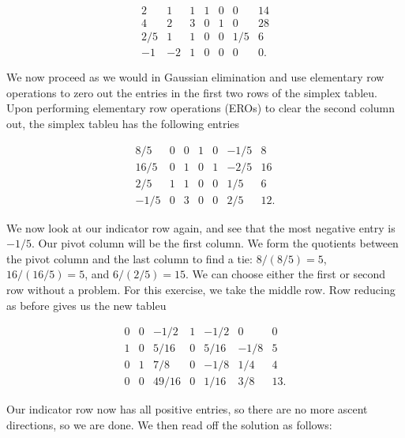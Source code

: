 \documentclass[12pt,english]{article}
\begin{document}
\begin{equation}
\begin{array}{cccccc|c}
2 	&	1	& 	1 	& 	1	& 	0	&	0	&	14 \\
4	&	2	& 	3	&	0	&	1	&	0	&	28 \\
2/5	&	1	&	1	&	0	&	0	& 	1/5	& 	6  \\
\hline
-1	& 	-2	&	1	& 	0	&	0	&	0	&	0.
\end{array}
\end{equation}

We now proceed as we would in Gaussian elimination and use elementary row operations to zero out the entries in the first two rows of the simplex tableu.   Upon performing elementary row operations (EROs) to clear the second column out, the simplex tableu has the following entries

\begin{equation}
\begin{array}{cccccc|c}
8/5 	&	0	&	0	&	1	&	0	&	-1/5 	&	8 \\
16/5	&	0	&	1	&	0	&	1	&	-2/5	&	16 \\
2/5	&	1	&	1	&	0	&	0	&	1/5	&	6 \\
\hline
-1/5	&	0	&	3	&	0	&	0	&	2/5	&	12.
\end{array}
\end{equation}

We now look at our indicator row again, and see that the most negative entry is $-1/5$.  Our pivot column will be the first column.  We form the quotients between the pivot column and the last column to find a tie: $8/(8/5) = 5$, $16/(16/5) = 5$, and $6/(2/5)=15$.  We can choose either the first or second row without a problem.  For this exercise, we take the middle row.   Row reducing as before gives us the new tableu

\begin{equation}
\begin{array}{cccccc|c}
0 	&	0	&	-1/2	&	1	&	-1/2	&	0 	&	0 \\
1	&	0	&	5/16	&	0	&	5/16	&	-1/8	&	5 \\
0	&	1	&	7/8	&	0	&	-1/8	&	1/4	&	4 \\
\hline
0	&	0	&   49/16  &	0	&	1/16	&	3/8	&	13.
\end{array}
\end{equation}

Our indicator row now has all positive entries, so there are no more ascent directions, so we are done.  We then read off the solution as follows:
\end{document}
